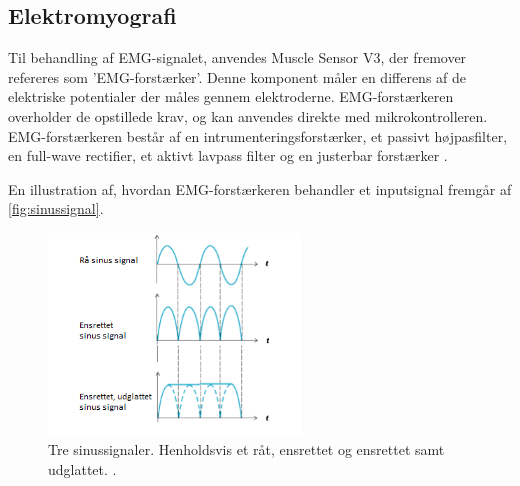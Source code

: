 


\subsection{Elektromyografi}
Til behandling af EMG-signalet, anvendes Muscle Sensor V3, der fremover refereres som 'EMG-forstærker'. Denne komponent måler en differens af de elektriske potentialer der måles gennem elektroderne. EMG-forstærkeren overholder de opstillede krav, og kan anvendes direkte med mikrokontrolleren. EMG-forstærkeren består af en intrumenteringsforstærker, et passivt højpasfilter, en full-wave rectifier, et aktivt lavpass filter og en justerbar forstærker \citep{advancertech2013}. 

En illustration af, hvordan EMG-forstærkeren behandler et inputsignal fremgår af \autoref{fig:sinussignal}.
\begin{figure}[H]
\centering
\includegraphics[width=0.6\textwidth]{figures/sinussignal.png}
\caption{Tre sinussignaler. Henholdsvis et råt, ensrettet og ensrettet samt udglattet. \citep{advancertech2013}.}
\label{fig:sinussignal}
\end{figure}

